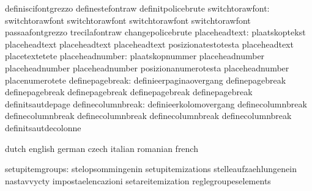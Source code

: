                                   definiscifontgrezzo              definestefontraw
                                  definitpolicebrute
                 switchtorawfont: switchtorawfont                  switchtorawfont
                                  switchtorawfont                  switchtorawfont
                                  passaafontgrezzo                 trecilafontraw
                                  changepolicebrute
                   placeheadtext: plaatskoptekst                   placeheadtext
                                  placeheadtext                    placeheadtext
                                  posizionatestotesta              placeheadtext
                                  placetextetete
                 placeheadnumber: plaatskopnummer                  placeheadnumber
                                  placeheadnumber                  placeheadnumber
                                  posizionanumerotesta             placeheadnumber
                                  placenumerotete
                 definepagebreak: definieerpaginaovergang          definepagebreak
                                  definepagebreak                  definepagebreak
                                  definepagebreak                  definepagebreak
                                  definitsautdepage
               definecolumnbreak: definieerkolomovergang           definecolumnbreak
                                  definecolumnbreak                definecolumnbreak
                                  definecolumnbreak                definecolumnbreak
                                  definitsautdecolonne

\stopcommands



\startcommands                    dutch                            english
                                  german                           czech
                                  italian                          romanian
                                  french

                 setupitemgroups: stelopsommingenin                setupitemizations
                                  stelleaufzaehlungenein           nastavvycty
                                  impostaelencazioni               setareitemization
                                  reglegroupeselements

\stopcommands

